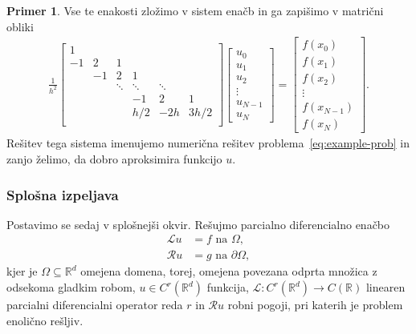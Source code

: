 \documentclass[12pt,a4paper,twoside]{article}
\theoremstyle{definition} %
\newtheorem{primer}[definicija]{Primer}
\theoremstyle{plain} %
\numberwithin{equation}{section}
\newcommand{\R}{\mathbb R}
\newcommand{\Rc}{\mathcal{R}}
\renewcommand{\L}{\mathcal{L}}
\begin{document}
\begin{primer}
Vse te enakosti zložimo v sistem enačb in ga zapišimo v matrični obliki
\begin{align}
  \frac{1}{h^2}
  \begin{bmatrix}
    1 &  \\
    -1 & 2 & 1 \\
    & -1 & 2 & 1 \\
    & & \!\ddots & \!\ddots & \! \ddots \\
    &&& -1 & 2 & 1 \\
    &&& h/2 & -2h & 3h/2 \\
  \end{bmatrix}
\begin{bmatrix}
  u_0 \\ u_1 \\ u_2 \\ \vdots \\ u_{N-1} \\ u_N
\end{bmatrix}
 =
 \begin{bmatrix}
   f(x_0) \\
   f(x_1) \\
   f(x_2) \\
   \vdots \\
   f(x_{N-1}) \\
   f(x_N)
 \end{bmatrix}.
\end{align}
Rešitev tega sistema imenujemo numerična rešitev problema~\eqref{eq:example-prob} in
zanjo želimo, da dobro aproksimira funkcijo $u$.
\end{primer}

\subsubsection{Splošna izpeljava}
\label{sec:splosna-izpeljava}
Postavimo se sedaj v splošnejši okvir.
Rešujmo parcialno diferencialno enačbo
\begin{align}
  \L u &= f \text{ na } \Omega, \label{eq:general-problem} \\
  \Rc u &= g \text{ na } \partial \Omega \nonumber,
\end{align}
kjer je $\Omega \subseteq \R^d$ omejena domena, torej, omejena povezana odprta
množica z odsekoma gladkim robom, $u \in C^r(\R^d)$ funkcija,
$\L\colon C^r(\R^d) \to C(\R)$ linearen
parcialni diferencialni operator reda $r$ in $\Rc u$ robni pogoji,
pri katerih je problem enolično rešljiv.
\end{document}
